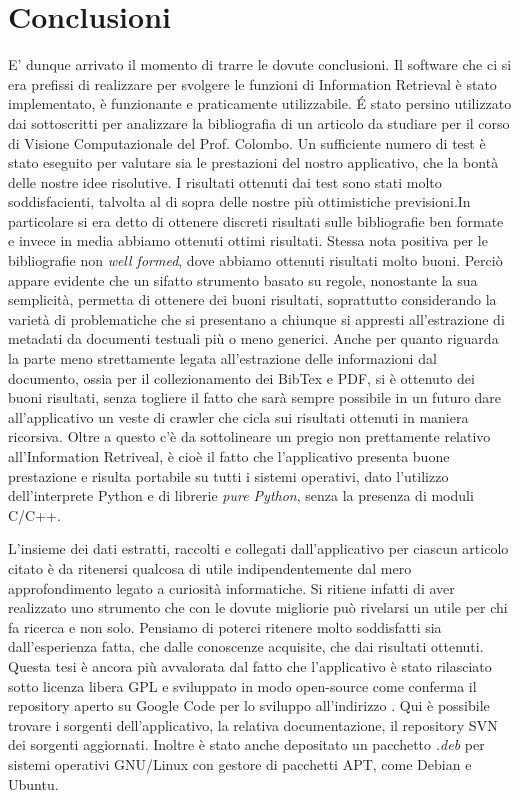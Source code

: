\section{Conclusioni} \label{conclusioni}
E' dunque arrivato il momento di trarre le dovute conclusioni. Il software che ci si era prefissi di realizzare per svolgere le funzioni di Information Retrieval è stato implementato, è funzionante e praticamente utilizzabile. \'E stato persino utilizzato dai sottoscritti per analizzare la bibliografia di un articolo da studiare per il corso di Visione Computazionale del Prof. Colombo. Un sufficiente numero di test è stato eseguito per valutare sia le prestazioni del nostro applicativo, che la bontà delle nostre idee risolutive. I risultati ottenuti dai test sono stati molto soddisfacienti, talvolta al di sopra delle nostre  più ottimistiche previsioni.In particolare si era detto di ottenere discreti risultati sulle bibliografie ben formate e invece in media abbiamo ottenuti ottimi risultati. Stessa nota positiva per le bibliografie non \textit{well formed}, dove abbiamo ottenuti risultati molto buoni. Perciò appare evidente che un sifatto strumento basato su regole, nonostante la sua semplicità, permetta di ottenere dei buoni risultati, soprattutto considerando la varietà di problematiche che si presentano a chiunque si appresti all'estrazione di metadati da documenti testuali più o meno generici. Anche per quanto riguarda la parte meno strettamente legata all'estrazione delle informazioni dal documento, ossia per il collezionamento dei BibTex e PDF, si è ottenuto dei buoni risultati, senza togliere il fatto che sarà sempre possibile in un futuro dare all'applicativo un veste di crawler che cicla sui risultati ottenuti in maniera ricorsiva. Oltre a questo c'è da sottolineare un pregio non prettamente relativo all'Information Retriveal, è cioè il fatto che l'applicativo presenta buone prestazione e risulta portabile su tutti i sistemi operativi, dato l'utilizzo dell'interprete Python e di librerie \textit{pure Python}, senza la presenza di moduli C/C++.

L'insieme dei dati estratti, raccolti e collegati dall'applicativo per ciascun articolo citato è da ritenersi qualcosa di utile indipendentemente dal mero approfondimento legato a curiosità informatiche. Si ritiene infatti di aver realizzato uno strumento che con le dovute migliorie può rivelarsi un utile per chi fa ricerca e non solo. Pensiamo di poterci ritenere molto soddisfatti sia dall'esperienza fatta, che dalle conoscenze acquisite, che dai risultati ottenuti. Questa tesi è ancora più avvalorata dal fatto che l'applicativo è stato rilasciato sotto licenza libera GPL e sviluppato in modo open-source come conferma il repository aperto su Google Code per lo sviluppo all'indirizzo  . Qui è possibile trovare i sorgenti dell'applicativo, la relativa documentazione, il repository SVN dei sorgenti aggiornati. Inoltre è stato anche depositato un pacchetto \textit{.deb} per sistemi operativi GNU/Linux con gestore di pacchetti APT, come Debian e Ubuntu.

